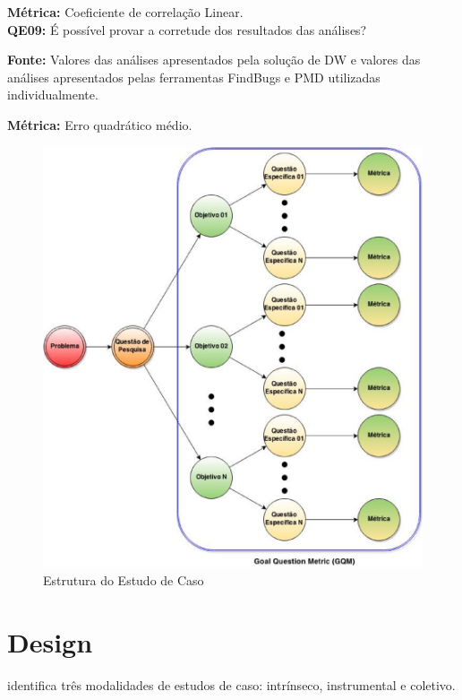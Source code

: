 \textbf{Métrica:} Coeficiente de correlação Linear.\\



\textbf{QE09: } É possível provar a corretude dos resultados das análises? 

\textbf{Fonte:} Valores das análises apresentados pela solução de DW e valores das análises apresentados pelas ferramentas FindBugs e PMD utilizadas individualmente.
 
\textbf{Métrica:} Erro quadrático médio.\\

	
\begin{figure}[h!]
\centering
\includegraphics[keepaspectratio=false,scale=0.5]{figuras/figuras_nilton/EstruturaEstudoCaso.eps}
\caption{Estrutura do Estudo de Caso}
\label{EstruturaEstudoCaso}
\end{figure}


\section{Design}
\label{sec:design} 

 identifica três modalidades de estudos de caso: intrínseco, instrumental e coletivo. 

